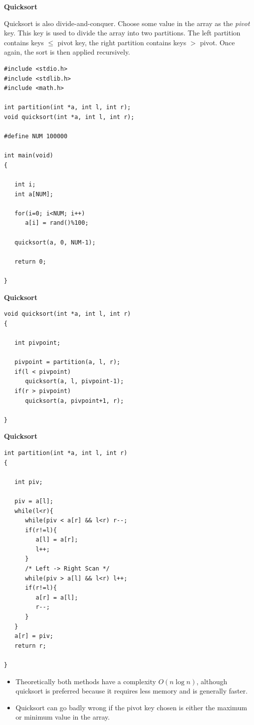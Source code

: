\documentclass[a4,portraitt]{slides}
\begin{document}
\newpage
{\samepage
\begin{center}
{\Large{\bf Quicksort}}
\end{center}
Quicksort is also divide-and-conquer. Choose some value
in the array as the {\it pivot} key. This key is used to divide
the array into two partitions. The left partition contains keys
$\leq$ pivot key, the right partition contains keys $>$ pivot.
Once again, the sort is then applied recursively.
{\small
\begin{verbatim}
#include <stdio.h>
#include <stdlib.h>
#include <math.h>

int partition(int *a, int l, int r);
void quicksort(int *a, int l, int r);

#define NUM 100000

int main(void)
{

   int i;
   int a[NUM];

   for(i=0; i<NUM; i++)
      a[i] = rand()%100;

   quicksort(a, 0, NUM-1);

   return 0;

}
\end{verbatim}
}}

\newpage
{\samepage
\begin{center}
{\Large{\bf Quicksort}}
\end{center}
\begin{verbatim}
void quicksort(int *a, int l, int r)
{

   int pivpoint;

   pivpoint = partition(a, l, r);
   if(l < pivpoint)
      quicksort(a, l, pivpoint-1);
   if(r > pivpoint)
      quicksort(a, pivpoint+1, r);

}

\end{verbatim}
}

\newpage
{\samepage
\begin{center}
{\Large{\bf Quicksort}}
\end{center}
{\small
\begin{verbatim}
int partition(int *a, int l, int r)
{

   int piv;

   piv = a[l];
   while(l<r){
      while(piv < a[r] && l<r) r--;
      if(r!=l){
         a[l] = a[r];
         l++;
      }
      /* Left -> Right Scan */
      while(piv > a[l] && l<r) l++;
      if(r!=l){
         a[r] = a[l];
         r--;
      }
   }
   a[r] = piv;
   return r;

}
\end{verbatim}
\begin{itemize}
\item Theoretically both methods have a complexity $O(n \log n)$,
although quicksort is preferred because it requires less memory and
is generally faster.
\item Quicksort can go badly wrong if the pivot key chosen is either
the maximum or minimum value in the array.
\end{itemize}
}}
\end{document}
